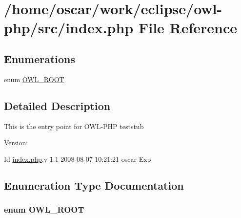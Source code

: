 \hypertarget{index_8php}{
\section{/home/oscar/work/eclipse/owl-php/src/index.php File Reference}
\label{index_8php}
}
\subsection*{Enumerations}
\begin{CompactItemize}
\item 
enum \hyperlink{index_8php_35612f9a6bd7277982731a74593272c4}{OWL\_\-ROOT} 
\end{CompactItemize}


\subsection{Detailed Description}
This is the entry point for OWL-PHP teststub \begin{Desc}
\item[Version:]\end{Desc}
\begin{Desc}
\item[Id]\hyperlink{index_8php}{index.php},v 1.1 2008-08-07 10:21:21 oscar Exp \end{Desc}


\subsection{Enumeration Type Documentation}
\hypertarget{index_8php_35612f9a6bd7277982731a74593272c4}{
\subsubsection{\setlength{\rightskip}{0pt plus 5cm}enum {\bf OWL\_\-ROOT}}}
\label{index_8php_35612f9a6bd7277982731a74593272c4}


